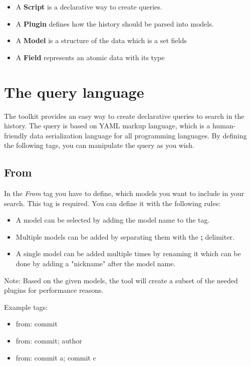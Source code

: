 \begin{itemize}
   \item A \textbf{Script} is a declarative way to create queries.
   \item A \textbf{Plugin} defines how the history should be parsed into models.
   \item A \textbf{Model} is a structure of the data which is a set fields
   \item A \textbf{Field} represents an atomic data with its type
\end{itemize}

\section{The query language}

The toolkit provides an easy way to create declarative queries to search in the history.
The query is based on YAML\cite{yaml} markup language, which is a human-friendly data serialization language for all programming languages. 
By defining the following tags, you can manipulate the query as you wish.

\subsection{From}

In the \textit{From} tag you have to define, which models you want to include in your search.
This tag is required.
You can define it with the following rules:

\begin{itemize}
	\item A model can be selected by adding the model name to the tag.
	\item Multiple models can be added by separating them with the \textbf{;} delimiter.
	\item A single model can be added multiple times by renaming it which can be done by adding a "nickname" after the model name.
\end{itemize}

Note: Based on the given models, the tool will create a subset of the needed plugins for performance reasons.

Example tags:
\begin{itemize}
	\item from: commit
	\item from: commit; author
	\item from: commit a; commit c
\end{itemize}


